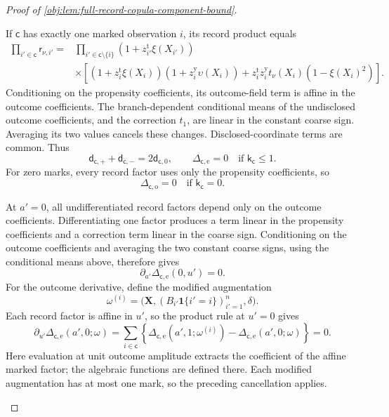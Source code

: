 \documentclass[11pt]{article}
\begin{document}
\begin{proof}[Proof of \cref{obj:lem:full-record-copula-component-bound}]
\begin{enumerate}
If \(\mathsf c\) has exactly one marked observation \(i\), its record product equals
\[
\begin{aligned}
\prod_{i'\in\mathsf c}\mathsf r_{\nu,i'}
={}&
\prod_{i'\in\mathsf c\setminus\{i\}}
 (1+z_{i'}^{\mathrm t}\xi(X_{i'}))\\
&\times
\left[
 (1+z_i^{\mathrm t}\xi(X_i))
 (1+z_i^{\mathrm y}\upsilon(X_i))
 +z_i^{\mathrm t}z_i^{\mathrm y}
   t_\nu(X_i)(1-\xi(X_i)^2)
\right].
\end{aligned}
\]
Conditioning on the propensity coefficients, its outcome-field term is affine in the outcome coefficients. The branch-dependent conditional means of the undisclosed outcome coefficients, and the correction \(t_1\), are linear in the constant coarse sign. Averaging its two values cancels these changes. Disclosed-coordinate terms are common. Thus
\[
\mathsf d_{\mathsf c,+}+\mathsf d_{\mathsf c,-}
 =2\mathsf d_{\mathsf c,0},
\qquad
\Delta_{\mathsf c,\mathrm e}=0
\quad\text{if }\mathsf k_{\mathsf c}\le1.
\]
For zero marks, every record factor uses only the propensity coefficients, so
\[
\Delta_{\mathsf c,\mathrm o}=0
\quad\text{if }\mathsf k_{\mathsf c}=0.
\]

At \(a'=0\), all undifferentiated record factors depend only on the outcome coefficients. Differentiating one factor produces a term linear in the propensity coefficients and a correction term linear in the coarse sign. Conditioning on the outcome coefficients and averaging the two constant coarse signs, using the conditional means above, therefore gives
\[
\partial_{a'}\Delta_{\mathsf c,\mathrm e}(0,u')=0.
\]
For the outcome derivative, define the modified augmentation
\[
\omega^{(i)}
 =\bigl(\mathbf X,(B_{i'}\mathbf1\{i'=i\})_{i'=1}^n,\delta\bigr).
\]
Each record factor is affine in \(u'\), so the product rule at \(u'=0\) gives
\[
\partial_{u'}\Delta_{\mathsf c,\mathrm e}(a',0;\omega)
 =
 \sum_{i\in\mathsf c}
 \left\{
 \Delta_{\mathsf c,\mathrm e}(a',1;\omega^{(i)})
 -\Delta_{\mathsf c,\mathrm e}(a',0;\omega)
 \right\}=0.
\]
Here evaluation at unit outcome amplitude extracts the coefficient of the affine marked factor; the algebraic functions are defined there. Each modified augmentation has at most one mark, so the preceding cancellation applies.


\end{enumerate}
\end{proof}
\end{document}
